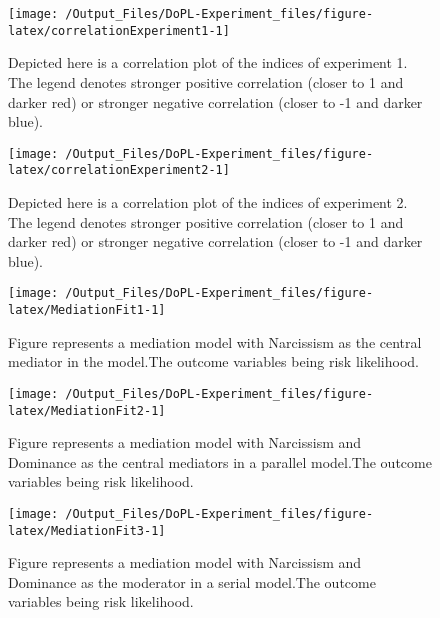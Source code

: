 \documentclass[
  donotrepeattitle,doc, 12pt, a4paper,floatsintext]{apa7}
\begin{document}
\begin{landscape}
\begin{figure}

{\centering \texttt{[image: /Output\_Files/DoPL-Experiment\_files/figure-latex/correlationExperiment1-1]} 

}

\caption{Depicted here is a correlation plot of the indices of experiment 1. The legend denotes stronger positive correlation (closer to 1 and darker red) or stronger negative correlation (closer to -1 and darker blue).}\label{fig:correlationExperiment1}
\end{figure}
\newpage
\begin{figure}

{\centering \texttt{[image: /Output\_Files/DoPL-Experiment\_files/figure-latex/correlationExperiment2-1]} 

}

\caption{Depicted here is a correlation plot of the indices of experiment 2. The legend denotes stronger positive correlation (closer to 1 and darker red) or stronger negative correlation (closer to -1 and darker blue).}\label{fig:correlationExperiment2}
\end{figure}
\end{landscape}
\newpage
\begin{figure}

{\centering \texttt{[image: /Output\_Files/DoPL-Experiment\_files/figure-latex/MediationFit1-1]} 

}

\caption{Figure represents a mediation model with Narcissism as the central mediator in the model.The outcome variables being risk likelihood.}\label{fig:MediationFit1}
\end{figure}
\begin{figure}

{\centering \texttt{[image: /Output\_Files/DoPL-Experiment\_files/figure-latex/MediationFit2-1]} 

}

\caption{Figure represents a mediation model with Narcissism and Dominance as the central mediators in a parallel model.The outcome variables being risk likelihood.}\label{fig:MediationFit2}
\end{figure}
\begin{figure}

{\centering \texttt{[image: /Output\_Files/DoPL-Experiment\_files/figure-latex/MediationFit3-1]} 

}

\caption{Figure represents a mediation model with Narcissism and Dominance as the moderator in a serial model.The outcome variables being risk likelihood.}\label{fig:MediationFit3}
\end{figure}
\end{document}
